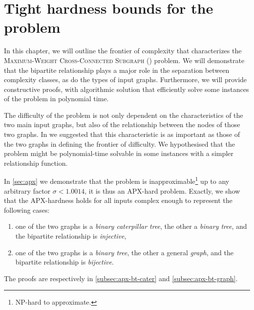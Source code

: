 \chapter{Tight hardness bounds for the \mwccs{} problem}
\label{chap:hard}

	In this chapter, we will outline the frontier of complexity that characterizes the \textsc{Maximum-Weight Cross-Connected Subgraph} (\mwccs{}) problem.
	We will demonstrate that the bipartite relationship plays a major role in the separation between complexity classes, as do the types of input graphs.
	Furthermore, we will provide constructive proofs, with algorithmic solution that efficiently solve some instances of the problem in polynomial time.

	The difficulty of the problem is not only dependent on the characteristics of the two main input graphs, but also of the relationship between the nodes of those two graphs.
	In \cite{hume2015approximation} we suggested that this characteristic is as important as those of the two graphs in defining the frontier of difficulty.
	We hypothesised that the problem might be polynomial-time solvable in some instances with a simpler relationship function.

	In \cref{sec:apx} we demonstrate that the \mwccs{} problem is inapproximable\footnote{NP-hard to approximate.} up to any arbitrary factor $\sigma < 1.0014$, it is thus an APX-hard problem.
	Exactly, we show that the APX-hardness holds for all inputs complex enough to represent the following cases:
	\begin{enumerate}
		\item one of the two graphs is a \emph{binary caterpillar tree}, the other a \emph{binary tree}, and the bipartite relationship is \emph{injective},
		\item one of the two graphs is a \emph{binary tree}, the other a general \emph{graph}, and the bipartite relationship is \emph{bijective}.
	\end{enumerate}
	The proofs are respectively in \cref{subsec:apx-bt-cater} and \cref{subsec:apx-bt-graph}.

